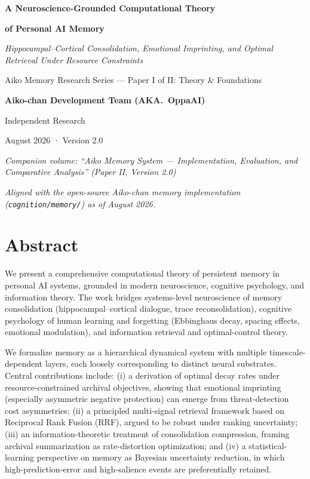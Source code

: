 \documentclass[]{article}
\title{}
\date{}
\begin{document}
\textbf{A Neuroscience-Grounded Computational Theory}

\textbf{of Personal AI Memory}

\emph{Hippocampal--Cortical Consolidation, Emotional Imprinting, and
Optimal Retrieval Under Resource Constraints}

Aiko Memory Research Series --- Paper I of II: Theory \& Foundations

\textbf{Aiko-chan Development Team (AKA.\ OppaAI)}

Independent Research

August 2026 · Version 2.0

\emph{Companion volume: ``Aiko Memory System --- Implementation,
Evaluation, and Comparative Analysis'' (Paper II, Version 2.0)}

\emph{Aligned with the open-source Aiko-chan memory implementation
(\texttt{cognition/memory/}) as of August 2026.}

\hypertarget{abstract}{%
\section{\texorpdfstring{\textbf{Abstract}}{Abstract}}\label{abstract}}

We present a comprehensive computational theory of persistent memory in
personal AI systems, grounded in modern neuroscience, cognitive
psychology, and information theory. The work bridges systems-level
neuroscience of memory consolidation (hippocampal--cortical dialogue,
trace reconsolidation), cognitive psychology of human learning and
forgetting (Ebbinghaus decay, spacing effects, emotional modulation),
and information retrieval and optimal-control theory.

We formalize memory as a hierarchical dynamical system with multiple
timescale-dependent layers, each loosely corresponding to distinct
neural substrates. Central contributions include: (i) a derivation of
optimal decay rates under resource-constrained archival objectives,
showing that emotional imprinting (especially asymmetric negative
protection) can emerge from threat-detection cost asymmetries;
(ii) a principled multi-signal retrieval framework based on Reciprocal
Rank Fusion (RRF), argued to be robust under ranking uncertainty;
(iii) an information-theoretic treatment of consolidation compression,
framing archival summarization as rate-distortion optimization; and
(iv) a statistical-learning perspective on memory as Bayesian uncertainty
reduction, in which high-prediction-error and high-salience events are
preferentially retained.
\end{document}
